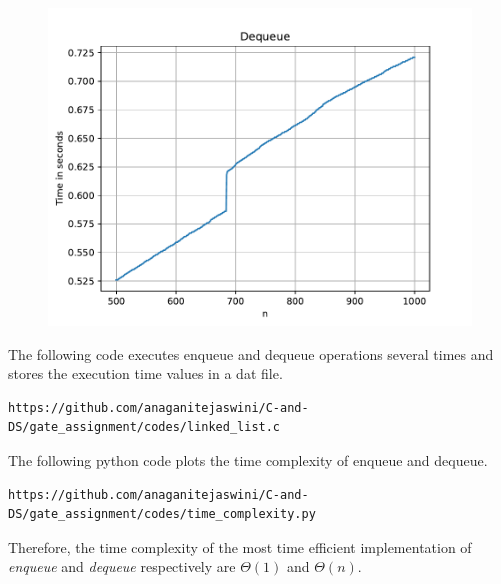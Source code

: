 \documentclass[journal,12pt,twocolumn]{IEEEtran}
\begin{document}
\begin{figure}[!ht]
    \begin{center}
    \includegraphics[width=\columnwidth]{./figs/dequeue}
    \end{center}
    \label{fig3}	
\end{figure}

The following code executes enqueue and dequeue operations several times and stores the execution time values in a dat file.

\begin{lstlisting}
https://github.com/anaganitejaswini/C-and-DS/gate_assignment/codes/linked_list.c
\end{lstlisting}
The following python code plots the time complexity of enqueue and dequeue.
\begin{lstlisting}
https://github.com/anaganitejaswini/C-and-DS/gate_assignment/codes/time_complexity.py
\end{lstlisting}



Therefore, the time complexity of the most time efficient implementation of \emph{enqueue} and \emph{dequeue} respectively are $\Theta(1)$ and $\Theta(n)$.
\end{document}
